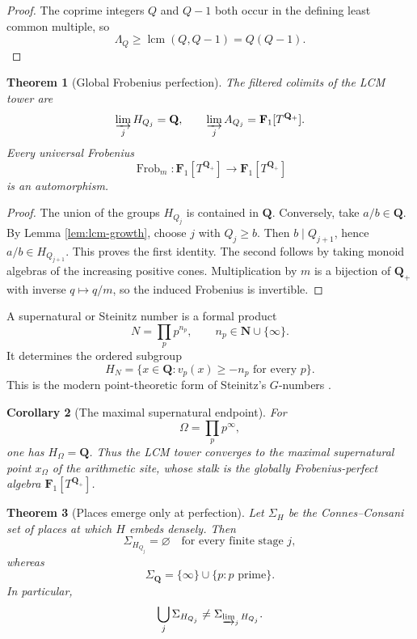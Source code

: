 \documentclass[11pt]{amsart}
\numberwithin{equation}{section}
\newtheorem{theorem}{Theorem}[section]
\newtheorem{corollary}[theorem]{Corollary}
\theoremstyle{definition}
\newcommand{\Q}{\mathbf Q}
\newcommand{\N}{\mathbf N}
\newcommand{\Fone}{\mathbf F_1}
\begin{document}
\begin{proof}
The coprime integers $Q$ and $Q-1$ both occur in the defining least common
multiple, so
\[
\Lambda_Q\geq\operatorname{lcm}(Q,Q-1)=Q(Q-1).
\]
\end{proof}

\begin{theorem}[Global Frobenius perfection]
\label{thm:global-perfection}
The filtered colimits of the LCM tower are
\[
\varinjlim_jH_{Q_j}=\Q,
\qquad
\varinjlim_jA_{Q_j}=\Fone[T^{\Q_+}].
\]
Every universal Frobenius
\[
\operatorname{Frob}_m:\Fone[T^{\Q_+}]
\longrightarrow\Fone[T^{\Q_+}]
\]
is an automorphism.
\end{theorem}

\begin{proof}
The union of the groups $H_{Q_j}$ is contained in $\Q$.  Conversely, take
$a/b\in\Q$.  By Lemma \ref{lem:lcm-growth}, choose $j$ with $Q_j\geq b$.
Then $b\mid Q_{j+1}$, hence $a/b\in H_{Q_{j+1}}$.  This proves the first
identity.  The second follows by taking monoid algebras of the increasing
positive cones.  Multiplication by $m$ is a bijection of $\Q_+$ with
inverse $q\mapsto q/m$, so the induced Frobenius is invertible.
\end{proof}

A supernatural or Steinitz number is a formal product
\[
N=\prod_p p^{n_p},
\qquad
n_p\in\N\cup\{\infty\}.
\]
It determines the ordered subgroup
\[
H_N=
\{x\in\Q:v_p(x)\geq-n_p\text{ for every }p\}.
\]
This is the modern point-theoretic form of Steinitz's $G$-numbers
\cite{Steinitz}.

\begin{corollary}[The maximal supernatural endpoint]
\label{cor:maximal-supernatural}
For
\[
\Omega=\prod_p p^\infty,
\]
one has $H_\Omega=\Q$.  Thus the LCM tower converges to the maximal
supernatural point $x_\Omega$ of the arithmetic site, whose stalk is the
globally Frobenius-perfect algebra $\Fone[T^{\Q_+}]$.
\end{corollary}

\begin{theorem}[Places emerge only at perfection]
\label{thm:places-emerge}
Let $\Sigma_H$ be the Connes--Consani set of places at which $H$ embeds
densely.  Then
\[
\Sigma_{H_{Q_j}}=\varnothing
\quad\text{for every finite stage }j,
\]
whereas
\[
\Sigma_{\Q}=\{\infty\}\cup\{p:p\text{ prime}\}.
\]
In particular,
\[
\bigcup_j\Sigma_{H_{Q_j}}
\neq
\Sigma_{\varinjlim_jH_{Q_j}}.
\]
\end{theorem}
\end{document}
